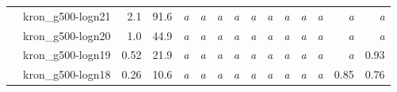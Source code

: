 \begin{table}[t]
\begin{tabular}{lrrrrrrrrrrrrr}
~~kron\_g500-logn21 & 2.1 & 91.6 & \emph{a} & \emph{a} & \emph{a} & \emph{a} & \emph{a} & \emph{a} & \emph{a} & \emph{a} & \emph{a} & \emph{a} & \emph{a} \\
~~kron\_g500-logn20 & 1.0 & 44.9 & \emph{a} & \emph{a} & \emph{a} & \emph{a} & \emph{a} & \emph{a} & \emph{a} & \emph{a} & \emph{a} & \emph{a} & \emph{a} \\
~~kron\_g500-logn19 & 0.52 & 21.9 & \emph{a} & \emph{a} & \emph{a} & \emph{a} & \emph{a} & \emph{a} & \emph{a} & \emph{a} & \emph{a} & \emph{a} & 0.93 \\
~~kron\_g500-logn18 & 0.26 & 10.6 & \emph{a} & \emph{a} & \emph{a} & \emph{a} & \emph{a} & \emph{a} & \emph{a} & \emph{a} & \emph{a} & 0.85 & 0.76 \\
\bottomrule
\end{tabular}
\end{table}
